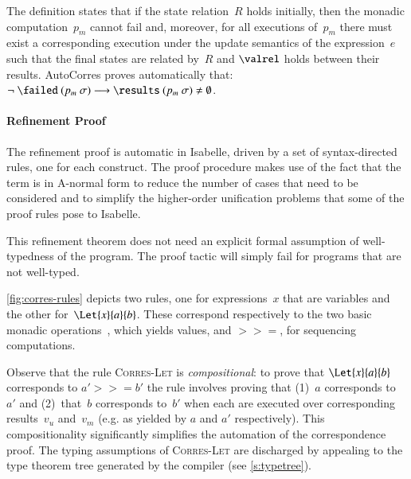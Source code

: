 \documentclass[9pt\ifFinal\else,preprint,nocopyrightspace\fi,\ifAlpha\else natbib,authoryear\fi]{sigplanconf}
\begin{document}
\noindent
The definition states that if the state relation~$R$ holds initially,
then the monadic computation~$p_m$ cannot fail and, moreover,
for all executions of~$p_m$ there must exist
a corresponding execution under the update semantics of the expression~$e$
such that the final states are related by~$R$ and $\valrel$ holds between
their results.
AutoCorres proves automatically that: $\neg \ \failed \ (p_m\  \sigma) \longrightarrow \results \ (p_m\ \sigma) \neq \emptyset$.

\paragraph{Refinement Proof}
The refinement proof is automatic in Isabelle, driven by a set of syntax-directed
\corres rules, one for each \cdsl construct. The proof procedure makes use
of the fact that the \cdsl term is in A-normal form to reduce the number of
cases that need to be considered and to simplify the higher-order unification
problems that some of the proof rules pose to Isabelle. 

This refinement theorem does not need an explicit formal assumption of
well-typedness of the \cdsl program. The proof tactic will simply fail for
programs that are not well-typed.

\autoref{fig:corres-rules} depicts two \corres rules, one for expressions~$x$
that are variables and the other for~$\Let{x}{a}{b}$.
These correspond respectively to the two basic monadic operations~\mreturn,
which yields values, and $>>=$, for sequencing computations.


Observe that the rule \textsc{Corres-Let} is \emph{compositional}: to prove
that $\Let{x}{a}{b}$ corresponds to $a' >>= b'$ the rule involves proving
that (1)~$a$ corresponds to $a'$ and (2)~that~$b$ corresponds to~$b'$ when each are
executed over corresponding results~$v_u$ and~$v_m$ (e.g. as yielded by
$a$ and $a'$ respectively). This compositionality significantly simplifies the automation of the correspondence proof.
The typing assumptions of \textsc{Corres-Let} are discharged by appealing to the type theorem tree generated by the compiler (see \autoref{s:typetree}). 
\end{document}
